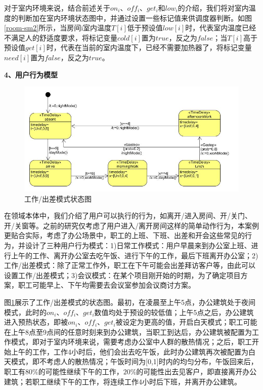 	对于室内环境来说，结合前述关于$on_{i}$、$off_{i}$、$get_{i}$和$low_{i}$的介绍，我们将对室内温度的判断加在室内环境状态图中，并通过设置一些标记值来供调度器判断。如图\ref{room-sm2}所示，当房间i室内温度$T[i]$低于预设值$low[i]$时，代表室内温度已经不满足人的舒适度要求，将标记变量$cold[i]$置为$true$，反之为$false$；当$T[i]$高于预设值$get[i]$时，代表在当前的室内温度下，已经不需要加热器了，将标记变量$need[i]$置为$false$，反之为$true$。
	
\textbf{4、用户行为模型}
	\begin{figure}[!t]
	\centering
	\includegraphics[width=4.8in]{user-sm.jpg}
	\caption{工作/出差模式状态图}
	\label{user-sm}
	\end{figure}
	
	在领域本体中，我们介绍了用户可以执行的行为，如离开/进入房间、开/关门、开/关窗等。之前的研究仅考虑了用户进入/离开房间这样的简单动作行为，本案例更贴合实际，考虑了办公场景中，职工的上班、下班、出差和开会这些常见的行为，并设计了三种用户行为模式：1)日常工作模式：用户早晨来到办公室上班、进行上午的工作、离开办公室去吃午饭、进行下午的工作，最后下班离开办公室；2)工作/出差模式：除了正常工作外，职工在下午可能会出差拜访客户等，由此可以设置工作/出差模式；3)会议模式：在某个项目刚开始的时期，为了确定项目方案，职工可能早上、下午均需要去会议室参加会议商讨方案。
	
	图\ref{user-sm}展示了工作/出差模式的状态图。最初，在凌晨至上午5点，办公建筑处于夜间模式，此时的$on_{i}$、$off_{i}$、$get_{i}$数值均处于预设的较低值；上午5点之后，办公建筑进入预热状态，即被$on_{i}$、$off_{i}$、$get_{i}$被设定为更高的值，开启白天模式；职工可能在上午8点至9点间的任意时刻来到办公建筑，当职工到达后，办公建筑被配置为工作模式，即对于室内环境来说，需要考虑办公室中人群的散热情况；之后，职工开始上午的工作，工作4小时后，他们会出去吃午饭，此时办公建筑再次被配置为白天模式，即不考虑人的散热情况；午饭时间为[0,1]时内的均匀分布，午饭回来后，职工有$80\%$的可能性继续下午的工作，$20\%$的可能性出去见客户，即直接离开办公建筑；若职工继续下午的工作，将连续工作4小时后下班，并离开办公建筑。
	
